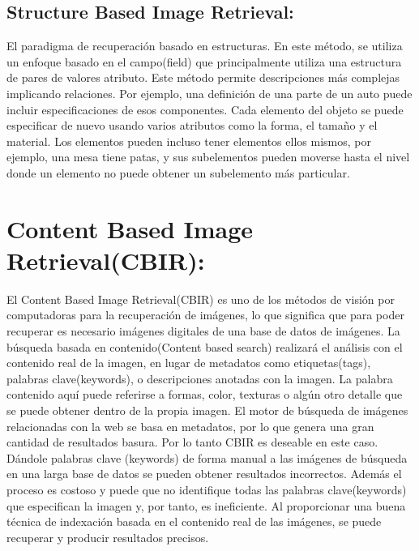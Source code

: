 \documentclass{llncs}
\begin{document}
\subsection{Structure Based Image Retrieval:}

El paradigma de recuperaci\'on basado en estructuras. En este m\'etodo, se utiliza un enfoque basado en el campo(field) que principalmente
utiliza una estructura de pares de valores atributo. Este m\'etodo permite descripciones m\'as complejas implicando relaciones. Por ejemplo,
una definici\'on de una parte de un auto puede incluir especificaciones de esos componentes. Cada elemento del objeto se puede especificar 
de nuevo usando varios atributos como la forma, el tama\~{n}o y el material. Los elementos pueden incluso tener elementos ellos mismos, por 
ejemplo, una mesa tiene patas, y sus subelementos pueden moverse hasta el nivel donde un elemento no puede obtener un subelemento m\'as particular.


\section{Content Based Image Retrieval(CBIR):}

El Content Based Image Retrieval(CBIR) es uno de los m\'etodos de visi\'on por computadoras para la recuperaci\'on de
im\'agenes, lo que significa que para poder recuperar es necesario im\'agenes digitales de una base de datos de im\'agenes. 
La b\'usqueda basada en contenido(Content based search) realizar\'a el an\'alisis con el contenido real de la imagen, en 
lugar de metadatos como etiquetas(tags), palabras clave(keywords), o descripciones anotadas con la imagen. La palabra 
contenido aqu\'i puede referirse a formas, color, texturas o alg\'un otro detalle que se puede obtener dentro de la propia
imagen. El motor de búsqueda de imágenes relacionadas con la web se basa en metadatos, por lo que genera una gran cantidad 
de resultados basura. Por lo tanto CBIR es deseable en este caso. D\'andole palabras clave (keywords) de forma manual a las 
im\'agenes de b\'usqueda en una larga base de datos se pueden obtener resultados incorrectos. Adem\'as el proceso es costoso y 
puede que no identifique todas las palabras clave(keywords) que especifican la imagen y, por tanto, es ineficiente. Al 
proporcionar una buena técnica de indexación basada en el contenido real de las imágenes, se puede recuperar y producir
resultados precisos.
\end{document}
